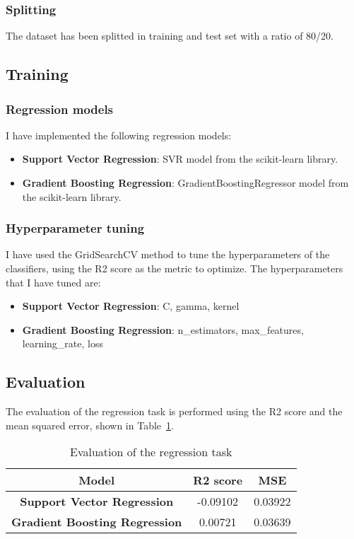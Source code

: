 \subsubsection{Splitting} \label{sec:preprocessing-splitting-regression}
The dataset has been splitted in training and test set with a ratio of 80/20.

\subsection{Training} \label{sec:training-regression}

\subsubsection{Regression models} \label{sec:training-regression-models-regression}
I have implemented the following regression models:
\begin{itemize}
    \item \textbf{Support Vector Regression}: SVR model from the scikit-learn library.
    \item \textbf{Gradient Boosting Regression}: GradientBoostingRegressor model from the scikit-learn library.
\end{itemize}

\subsubsection{Hyperparameter tuning} \label{sec:training-hyperparameter-tuning-regression}
I have used the GridSearchCV method to tune the hyperparameters of the classifiers, using the R2 score as the metric to optimize.
The hyperparameters that I have tuned are:
\begin{itemize}
    \item \textbf{Support Vector Regression}: C, gamma, kernel
    \item \textbf{Gradient Boosting Regression}: n\_estimators, max\_features, learning\_rate, loss
\end{itemize}

\subsection{Evaluation}
The evaluation of the regression task is performed using the R2 score and the mean squared error, shown in Table~\ref{tab:regression-evaluation}.

\begin{table}
    \centering
    \begin{tabular}{|c|c|c|}
        \hline
        \textbf{Model} & \textbf{R2 score} & \textbf{MSE} \\
        \hline
        \textbf{Support Vector Regression} & -0.09102 & 0.03922 \\
        \hline
        \textbf{Gradient Boosting Regression} & 0.00721 & 0.03639 \\
        \hline
    \end{tabular}
    \caption{Evaluation of the regression task}
    \label{tab:regression-evaluation}
\end{table}

